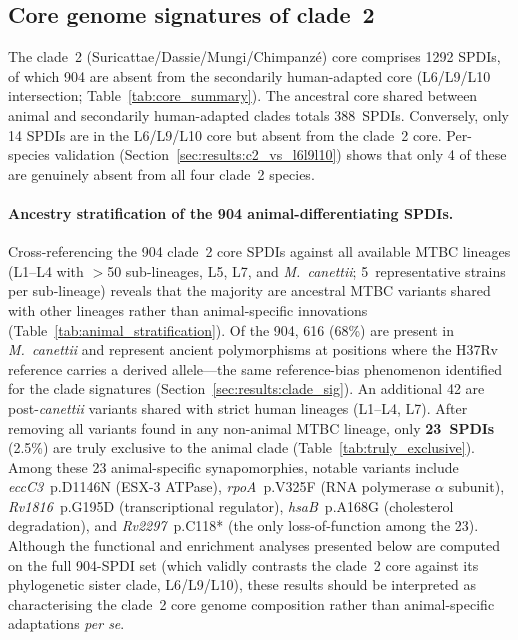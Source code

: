 \documentclass[11pt,a4paper]{article}
\begin{document}
\subsection{Core genome signatures of clade~2}
\label{sec:results:core}

The clade~2 (Suricattae/Dassie/Mungi/Chimpanzé) core comprises
\num{1292} SPDIs, of which 904 are absent
from the secondarily human-adapted core (L6/L9/L10 intersection;
Table~\ref{tab:core_summary}).
%
The ancestral core shared between animal and secondarily human-adapted clades totals 388~SPDIs.
%
Conversely, only 14 SPDIs are in the L6/L9/L10 core but absent from the
clade~2 core. Per-species validation
(Section~\ref{sec:results:c2_vs_l6l9l10}) shows that only 4 of these are
genuinely absent from all four clade~2 species.

\label{sec:results:stratification}
\paragraph{Ancestry stratification of the 904 animal-differentiating SPDIs.}
Cross-referencing the 904 clade~2 core SPDIs against all available MTBC lineages
(L1--L4 with $>$50 sub-lineages, L5, L7, and \textit{M.~canettii}; 5~representative
strains per sub-lineage) reveals that the majority are ancestral MTBC variants
shared with other lineages rather than animal-specific innovations
(Table~\ref{tab:animal_stratification}).
%
Of the 904, \num{616} (68\%) are present in \textit{M.~canettii} and represent
ancient polymorphisms at positions where the H37Rv reference carries a derived
allele---the same reference-bias phenomenon identified for the clade
signatures (Section~\ref{sec:results:clade_sig}).
%
An additional 42 are post-\textit{canettii} variants shared with strict human
lineages (L1--L4, L7).
%
After removing all variants found in any non-animal MTBC lineage, only
\textbf{23~SPDIs} (2.5\%) are truly exclusive to the animal clade
(Table~\ref{tab:truly_exclusive}).
%
Among these 23 animal-specific synapomorphies, notable variants include
\textit{eccC3}~p.D1146N (ESX-3 ATPase), \textit{rpoA}~p.V325F
(RNA polymerase $\alpha$ subunit), \textit{Rv1816}~p.G195D (transcriptional
regulator), \textit{hsaB}~p.A168G (cholesterol degradation), and
\textit{Rv2297}~p.C118* (the only loss-of-function among the 23).
%
Although the functional and enrichment analyses presented below are computed
on the full 904-SPDI set (which validly contrasts the clade~2 core against
its phylogenetic sister clade, L6/L9/L10), these results should be
interpreted as characterising the clade~2 core genome composition rather
than animal-specific adaptations \emph{per se}.
\end{document}
